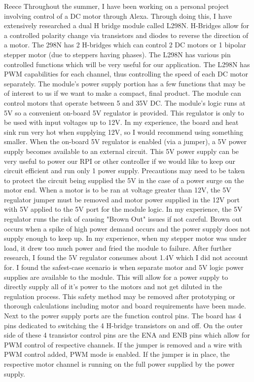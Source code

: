 \documentclass[fontsize=11pt, %
                             paper=letter, %
                             twoside, %
                             captions=tableheading,
                             index=totoc,
                             hyperref]{labbook}
\begin{document}
Reece \newline
Throughout the summer, I have been working on a personal project involving control of a DC motor through Alexa. Through doing this, I have extensively researched a dual H bridge module called L298N. H-Bridges allow for a controlled polarity change via transistors and diodes to reverse the direction of a motor. The 298N has 2 H-bridges which can control 2 DC motors or 1 bipolar stepper motor (due to steppers having phases). \newline
\newline The L298N has various pin controlled functions which will be very useful for our application. The L298N has PWM capabilities for each channel, thus controlling the speed of each DC motor separately. 
\newline\newline The module's power supply portion has a few functions that may be of interest to us if we want to make a compact, final product. The module can control motors that operate between 5 and 35V DC. The module's logic runs at 5V so a convenient on-board 5V regulator is provided. This regulator is only to be used with input voltages up to 12V. In my experience, the board and heat sink run very hot when supplying 12V, so I would recommend using something smaller. When the on-board 5V regulator is enabled (via a jumper), a 5V power supply becomes available to an external circuit. This 5V power supply can be very useful to power our RPI or other controller if we would like to keep our circuit efficient and run only 1 power supply. Precautions may need to be taken to protect the circuit being supplied the 5V in the case of a power surge on the motor end. When a motor is to be ran at voltage greater than 12V, the 5V regulator jumper must be removed and motor power supplied in the 12V port with 5V applied to the 5V port for the module logic. In my experience, the 5V regulator runs the risk of causing "Brown Out" issues if not careful. Brown out occurs when a spike of high power demand occurs and the power supply does not supply enough to keep up. In my experience, when my stepper motor was under load, it drew too much power and fried the module to failure. After further research, I found the 5V regulator consumes about 1.4V which I did not account for. I found the safest-case scenario is when separate motor and 5V logic power supplies are available to the module. This will allow for a power supply to directly supply all of it's power to the motors and not get diluted in the regulation process. This safety method may be removed after prototyping or thorough calculations including motor and board requirements have been made. 
\newline\newline
Next to the power supply ports are the function control pins. The board has 4 pins dedicated to switching the 4 H-bridge transistors on and off. On the outer side of these 4 transistor control pins are the ENA and ENB pins which allow for PWM control of respective channels. If the jumper is removed and a wire with PWM control added, PWM mode is enabled. If the jumper is in place, the respective motor channel is running on the full power supplied by the power supply. 
\end{document}
